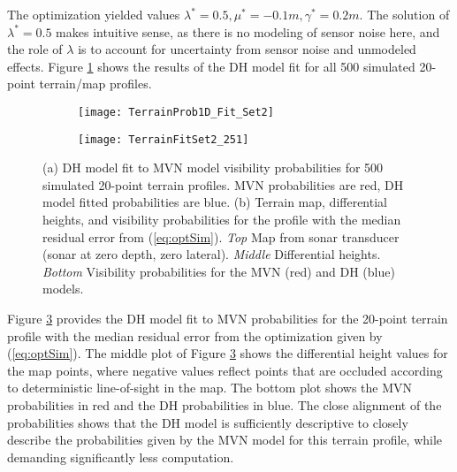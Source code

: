 \noindent The optimization yielded values $\lambda^* = 0.5, \mu^* = -0.1m, \gamma^* = 0.2m$.  
The solution of $\lambda^* = 0.5$ makes intuitive sense, as there is no modeling of sensor noise here, and the role of $\lambda$ is to account for uncertainty from sensor noise and unmodeled effects. Figure \ref{fig:TerrainProb_MVNDH} shows the results of the DH model fit for all 500 simulated 20-point terrain/map profiles. 

\begin{figure}[!h]
	\centering
	\begin{subfigure}[b]{0.4\textwidth}
		\texttt{[image: TerrainProb1D\_Fit\_Set2]}
		\caption{}
		\label{fig:TerrainProb_MVNDH}
	\end{subfigure}
	\centering
	\begin{subfigure}[b]{0.48\textwidth}
		\texttt{[image: TerrainFitSet2\_251]}
		\caption{}
		\label{fig:TerrainProb_251}
	\end{subfigure}
	\caption{(a) DH model fit to MVN model visibility probabilities for 500 simulated 20-point terrain profiles. MVN probabilities are red, DH model fitted probabilities are blue. (b) Terrain map, differential heights, and visibility probabilities for the profile with the median residual error from (\ref{eq:optSim}).  \emph{Top} Map from sonar transducer (sonar at zero depth, zero lateral). \emph{Middle} Differential heights. \emph{Bottom} Visibility probabilities for the MVN (red) and DH (blue) models. }
\end{figure}

Figure \ref{fig:TerrainProb_251} provides the DH model fit to MVN probabilities for the 20-point terrain profile with the median residual error from the optimization given by (\ref{eq:optSim}).  The middle plot of Figure \ref{fig:TerrainProb_251} shows the differential height values for the map points, where negative values reflect points that are occluded according to deterministic line-of-sight in the map.  The bottom plot shows the MVN probabilities in red and the DH probabilities in blue.  The close alignment of the probabilities shows that the DH model is sufficiently descriptive to closely describe the probabilities given by the MVN model for this terrain profile, while demanding significantly less computation.

